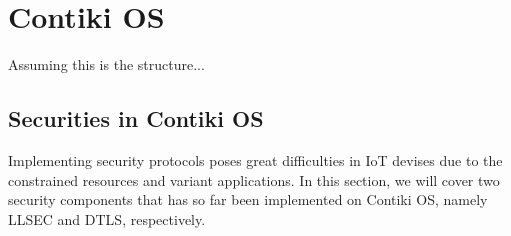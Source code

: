 \chapter{Contiki OS}
Assuming this is the structure...

\section{Securities in Contiki OS}

%
%
%
%
%

Implementing security protocols poses great difficulties in IoT devises due to the constrained resources and variant applications. In this section, we will cover two security components that has so far been implemented on Contiki OS, namely LLSEC and DTLS, respectively.

